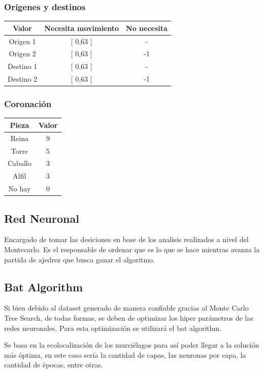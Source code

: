 \subsubsection{Orígenes y destinos}
\begin{center}
	\begin{tabular}{|c|c|c|}
		\hline
		\textbf{Valor} & \textbf{Necesita movimiento} & \textbf{No necesita} \\ \hline
		Origen 1    & [ 0,63 ] & -\\ \hline
		Origen 2    & [ 0,63 ] & -1\\\hline
		Destino 1   & [ 0,63 ] & -\\\hline
		Destino 2   & [ 0,63 ] & -1\\\hline
	\end{tabular}
\end{center}
\subsubsection{Coronación}
\begin{center}
	\begin{tabular}{|c|c|}
		\hline
		\textbf{Pieza} & \textbf{Valor} \\ \hline
		Reina & 9\\ \hline
		Torre  & 5 \\\hline
		Caballo   & 3 \\\hline
		Alfil   & 3 \\\hline
		No hay   & 0 \\\hline
	\end{tabular}    
\end{center}


\subsection{Red Neuronal}
Encargado de tomar las desiciones en base de los  analisis realizados a nivel del Montecarlo. Es el  responsable de ordenar que es lo que se hace mientras avanza la partida de ajedrez que busca ganar el algoritmo.

\subsection{Bat Algorithm}
Si bien debido al dataset generado de manera confiable gracias al Monte Carlo Tree Search, de todas formas, se deben de optimizar los hiper parámetros de las redes neuronales. Para esta optimización se utilizará el bat algorithm.




Se basa en la ecolocalización de los murciélagos para así poder llegar a la solución más óptima, en este caso sería la cantidad de capas, las neuronas por capa, la cantidad de épocas, entre otras.



